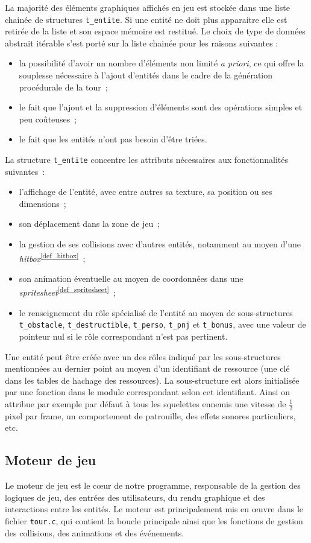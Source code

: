 \documentclass[a4paper,12pt]{article}
\newcommand\refsuscrite[1]{\textsuperscript{\ref{#1}}}
\begin{document}
La majorité des éléments graphiques affichés en jeu est stockée dans une liste chainée de structures \texttt{t\_entite}.
Si une entité ne doit plus apparaitre elle est retirée de la liste et son espace mémoire est restitué.
Le choix de type de données abstrait itérable s’est porté sur la liste chainée pour les raisons suivantes :
\begin{itemize}
    \item la possibilité d’avoir un nombre d’éléments non limité \textit{a priori}, ce qui offre la souplesse nécessaire à l’ajout d’entités dans le cadre de la génération procédurale de la tour ;
    \item le fait que l’ajout et la suppression d’éléments sont des opérations simples et peu coûteuses ;
    \item le fait que les entités n’ont pas besoin d’être triées.
\end{itemize}

La structure \texttt{t\_entite} concentre les attributs nécessaires aux fonctionnalités suivantes :
\begin{itemize}
	\item l’affichage de l’entité, avec entre autres sa texture, sa position ou ses dimensions ;
	\item son déplacement dans la zone de jeu ;
	\item la gestion de ses collisions avec d’autres entités, notamment au moyen d’une \textit{hitbox}\refsuscrite{def_hitbox} ;
	\item son animation éventuelle au moyen de coordonnées dans une \textit{spritesheet}\refsuscrite{def_spritesheet} ;
	\item le renseignement du rôle spécialisé de l’entité au moyen de sous-structures \texttt{t\_obstacle}, \texttt{t\_destructible}, \texttt{t\_perso}, \texttt{t\_pnj} et \texttt{t\_bonus}, avec une valeur de pointeur nul si le rôle correspondant n’est pas pertinent.
\end{itemize}
Une entité peut être créée avec un des rôles indiqué par les sous-structures mentionnées au dernier point au moyen d’un identifiant de ressource (une clé dans les tables de hachage des ressources). La sous-structure est alors initialisée par une fonction dans le module correspondant selon cet identifiant. Ainsi on attribue par exemple par défaut à tous les squelettes ennemis une vitesse de $\frac12$ pixel par frame, un comportement de patrouille, des effets sonores particuliers, etc.

\subsection{Moteur de jeu}
Le moteur de jeu est le cœur de notre programme, responsable de la gestion des logiques de jeu, des entrées des utilisateurs, du rendu graphique et des interactions entre les entités. Le moteur est principalement mis en œuvre dans le fichier \texttt{tour.c}, qui contient la boucle principale ainsi que les fonctions de gestion des collisions, des animations et des événements.
\end{document}
